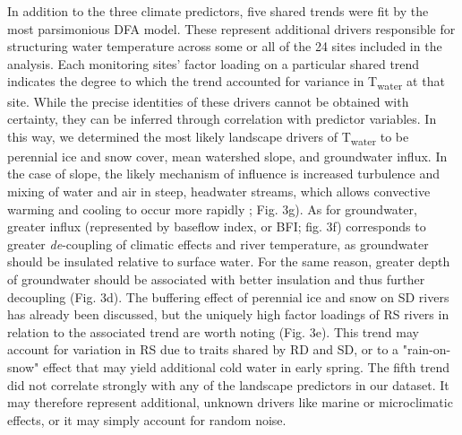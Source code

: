 \documentclass[notitlepage]{article}
\begin{document}
In addition to the three climate predictors, five shared trends were fit by the most parsimonious DFA model. These represent additional drivers responsible for structuring water temperature across some or all of the 24 sites included in the analysis. Each monitoring sites' factor loading on a particular shared trend indicates the degree to which the trend accounted for variance in T\textsubscript{water} at that site. While the precise identities of these drivers cannot be obtained with certainty, they can be inferred through correlation with predictor variables. In this way, we determined the most likely landscape drivers of T\textsubscript{water} to be perennial ice and snow cover, mean watershed slope, and groundwater influx. In the case of slope, the likely mechanism of influence is increased turbulence and mixing of water and air in steep, headwater streams, which allows convective warming and cooling to occur more rapidly \citealt{brutsaert1975theory}; Fig. 3g). As for groundwater, greater influx (represented by baseflow index, or BFI; fig. 3f) corresponds to greater {\it de}-coupling of climatic effects and river temperature, as groundwater should be insulated relative to surface water. For the same reason, greater depth of groundwater should be associated with better insulation and thus further decoupling (Fig. 3d). The buffering effect of perennial ice and snow on SD rivers has already been discussed, but the uniquely high factor loadings of RS rivers in relation to the associated trend are worth noting (Fig. 3e). This trend may account for variation in RS due to traits shared by RD and SD, or to a "rain-on-snow" effect that may yield additional cold water in early spring. The fifth trend did not correlate strongly with any of the landscape predictors in our dataset. It may therefore represent additional, unknown drivers like marine or microclimatic effects, or it may simply account for random noise.
\end{document}
